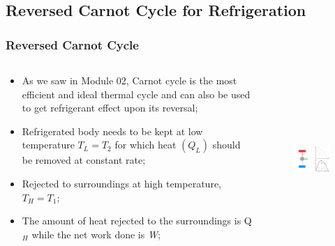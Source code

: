 \documentclass[10pt,compress]{beamer}
\begin{document}
\subsection{Reversed Carnot Cycle for Refrigeration}
\begin{frame}
 \frametitle{Reversed Carnot Cycle}
  \begin{columns}
   \begin{column}[c]{0.45\linewidth}
    \begin{itemize}
     \item <1-> As we saw in Module 02, Carnot cycle is the most efficient and ideal thermal cycle and can also be used to get refrigerant effect upon its reversal;
     \item <2-> Refrigerated body needs to be kept at low temperature $T_{L}=T_{2}$ for which heat $\left(Q_{L}\right)$ should be removed at constant rate;
     \item <3-> Rejected to surroundings at high temperature, $T_{H}=T_{1}$;
     \item <4-> The amount of heat rejected to the surroundings is Q$_{H}$ while the net work done is {\it W};
    \end{itemize}
   \end{column}
   \begin{column}[c]{0.55\linewidth}
    \begin{figure}%
     \begin{center}
      \includegraphics[width=6.8cm,height=6.5cm]{./Pics/Overview_Refrig4}
     \end{center}
    \end{figure}  
   \end{column}  
  \end{columns}
\end{frame}
\end{document}
